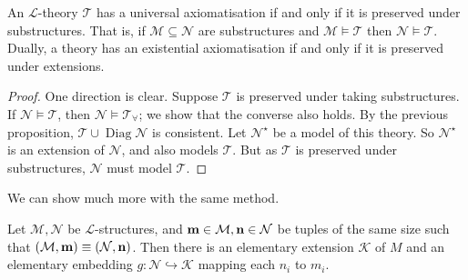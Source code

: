 \begin{corollary}[Tarski, \L{}o\'s]
    An \( \mathcal L \)-theory \( \mathcal T \) has a universal axiomatisation if and only if it is preserved under substructures.
    That is, if \( \mathcal M \subseteq \mathcal N \) are substructures and \( \mathcal M \vDash \mathcal T \) then \( \mathcal N \vDash \mathcal T \).
    Dually, a theory has an existential axiomatisation if and only if it is preserved under extensions.
\end{corollary}
\begin{proof}
    One direction is clear.
    Suppose \( \mathcal T \) is preserved under taking substructures.
    If \( \mathcal N \vDash \mathcal T \), then \( \mathcal N \vDash \mathcal T_\forall \); we show that the converse also holds.
    By the previous proposition, \( \mathcal T \cup \operatorname{Diag} \mathcal N \) is consistent.
    Let \( \mathcal N^\star \) be a model of this theory.
    So \( \mathcal N^\star \) is an extension of \( \mathcal N \), and also models \( \mathcal T \).
    But as \( \mathcal T \) is preserved under substructures, \( \mathcal N \) must model \( \mathcal T \).
\end{proof}
We can show much more with the same method.
\begin{theorem}
    Let \( \mathcal M, \mathcal N \) be \( \mathcal L \)-structures, and \( \vb m \in \mathcal M, \vb n \in \mathcal N \) be tuples of the same size such that \( (\mathcal M, \vb m) \equiv (\mathcal N, \vb n) \).
    Then there is an elementary extension \( \mathcal K \) of \( M \) and an elementary embedding \( g : \mathcal N \hookrightarrow \mathcal K \) mapping each \( n_i \) to \( m_i \).
\end{theorem}
